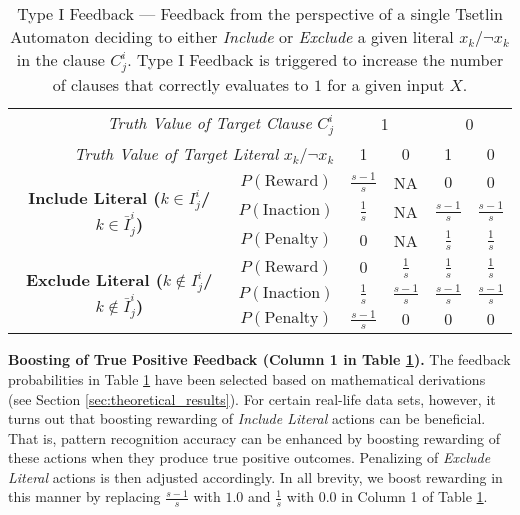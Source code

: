\documentclass[11pt,a4paper]{article}
\newcommand{\True}{\mbox{1}}
\newcommand{\False}{\mbox{0}}
\begin{document}
\begin{table}[bh!]
\centering
\begin{tabular}{c|ccccc}
\multicolumn{2}{r|}{{\it Truth Value of Target Clause} $C_j^i$ }&\multicolumn{2}{c}{\True}&\multicolumn{2}{c}{\False}\\  
\multicolumn{2}{r|}{{\it Truth Value of Target Literal} $x_k$/$\lnot x_k$}&{\True}&{\False}&{\True}&{\False}\\
 \hline
 \hline
    \multirow{3}{*}{\bf Include Literal ($k \in I_j^i$/$k \in \bar I_j^i$)}&\multicolumn{1}{c|}{$P(\mathrm{Reward})$}&$\frac{s-1}{s}$&NA&$0$&$0$\\
    &\multicolumn{1}{c|}{$P(\mathrm{Inaction})$}&$\frac{1}{s}$&NA&$\frac{s-1}{s}$&$\frac{s-1}{s}$\\
  &\multicolumn{1}{c|}{$P(\mathrm{Penalty})$}&$0$&NA&$\frac{1}{s} $&$\frac{1}{s}$\\
  \hline
  \multirow{3}{*}{\bf Exclude Literal ($k \notin I_j^i$/$k \notin \bar I_j^i$)}&\multicolumn{1}{c|}{$P(\mathrm{Reward})$}&$0$&$\frac{1}{s}$&$\frac{1}{s}$ &$\frac{1}{s}$\\
  &\multicolumn{1}{c|}{$P(\mathrm{Inaction})$}&$\frac{1}{s}$&$\frac{s-1}{s}$&$\frac{s-1}{s}$ &$\frac{s-1}{s}$\\
  &\multicolumn{1}{c|}{$P(\mathrm{Penalty})$}&$\frac{s-1}{s}$&$0$&$0$&$0$\\
  \hline
\end{tabular}
\caption{Type I Feedback --- Feedback from the perspective of a single Tsetlin Automaton deciding to either \emph{Include} or \emph{Exclude} a given literal $x_k$/$\lnot x_k$ in the clause $C^i_j$. Type I Feedback is triggered to increase the number of clauses that correctly evaluates to $\True$ for a given input $X$.}
\label{table:type_i_feedback}
\end{table}

{\bf Boosting of True Positive Feedback (Column 1 in Table \ref{table:type_i_feedback}).} The feedback probabilities in Table \ref{table:type_i_feedback} have been selected based on mathematical derivations (see Section \ref{sec:theoretical_results}). For certain real-life data sets, however, it turns out that boosting rewarding of \emph{Include Literal} actions can be beneficial. That is, pattern recognition accuracy can be enhanced by boosting rewarding of these actions when they produce true positive outcomes. Penalizing of \emph{Exclude Literal} actions is then adjusted accordingly.  In all brevity, we boost rewarding in this manner by replacing $\frac{s-1}{s}$ with $1.0$ and $\frac{1}{s}$ with $0.0$ in Column 1 of Table \ref{table:type_i_feedback}.
\end{document}
